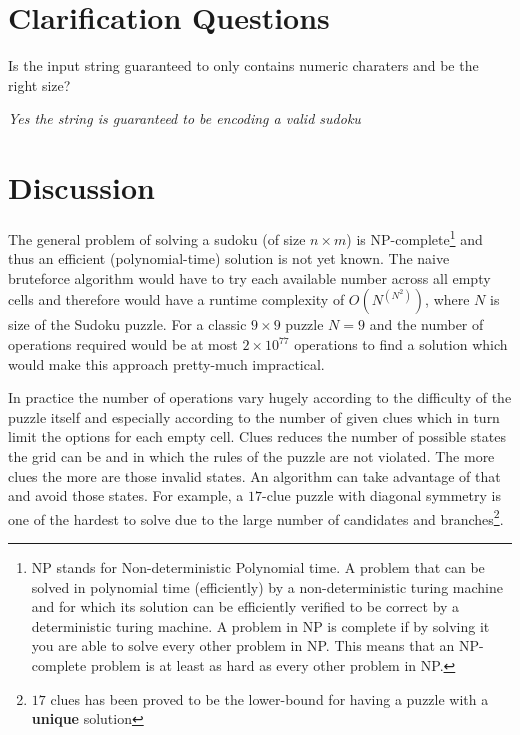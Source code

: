 \section{Clarification Questions}

\begin{QandA}
	\item Is the input string guaranteed to only contains numeric charaters and be the right size?
	\begin{answered}
		\textit{Yes the string is guaranteed to be encoding a valid sudoku}
	\end{answered}	
\end{QandA}

\section{Discussion}
\label{sudoku:sec:discussion}
The general problem of solving a sudoku (of size $n\times m$) is NP-complete\footnote{NP stands for
Non-deterministic Polynomial time. A problem that can be solved in polynomial time (efficiently) by
a non-deterministic turing machine and for which its solution can be efficiently verified to be
correct by a deterministic turing machine. A problem in NP is complete if by solving it you are able
to solve every other problem in NP. This means that an NP-complete problem is at least as hard as
every other problem in NP.} and thus an efficient (polynomial-time) solution is not yet known. The
naive bruteforce algorithm would have to try each available number across all empty cells and
therefore would have a runtime complexity of $O(N^{(N^2)})$, where $N$ is size of the Sudoku puzzle.
For a classic  $9 \times 9$ puzzle $N = 9$ and the number of operations required would be at most $2
\times 10^{77}$ operations to find a solution which would make this approach pretty-much
impractical. 

In practice the number of operations vary hugely according to the difficulty of the puzzle itself
and especially according to the number of given clues which in turn limit the options for each empty
cell. Clues reduces the number of possible states the grid can be and in which the rules of the
puzzle are not violated. The more clues the more are those invalid states. An algorithm can take
advantage of that and avoid those states. For example, a $17$-clue puzzle with diagonal symmetry is
one of the hardest to solve due to the large number of candidates and branches\footnote{$17$ clues
has been proved to be the lower-bound for having a puzzle with a \textbf{unique} solution}. 

